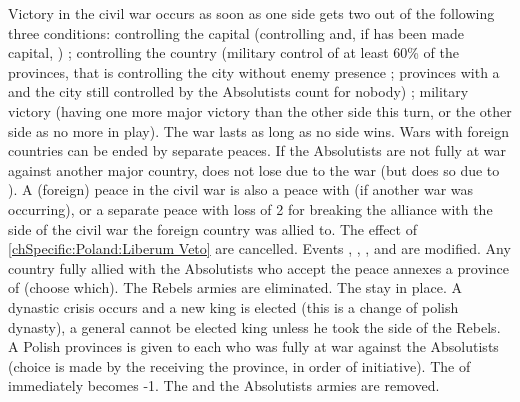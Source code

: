 \phpaix
\aparag Victory in the civil war occurs as soon as one side gets two out of
the following three conditions:
\bparag controlling the capital (controlling \provinceMalopolska and, if
\villeVarsovie has been made capital, \provinceMazowia) ;
\bparag controlling the country (military control of at least 60\% of the
provinces, that is controlling the city without enemy presence ; provinces
with a \REVOLT and the city still controlled by the Absolutists count for
nobody) ;
\bparag military victory (having one more major victory than the other side
this turn, or the other side as no more \ARMY in play).
\aparag The war lasts as long as no side wins.
\aparag Wars with foreign countries can be ended by separate peaces.
\bparag If the Absolutists are not fully at war against another major country,
\POL does not lose \STAB due to the war (but does so due to \REVOLT ).
\bparag A (foreign) peace in the civil war is also a peace with \POL (if
another war was occurring), or a separate peace with loss of 2 \STAB for
breaking the alliance with the side of the civil war the foreign country was
allied to.
\bparag The effect of \ref{chSpecific:Poland:Liberum Veto} are cancelled.
\bparag Events , ,
,  and
 are modified.
\bparag Any country fully allied with the Absolutists who accept the peace
annexes a province of \POL (\POL choose which).
\bparag The Rebels armies are eliminated.
\bparag The \REVOLT stay in place.
\bparag A dynastic crisis occurs and a new king is elected (this is a change
of polish dynasty), a general cannot be elected king unless he took the side
of the Rebels.
\bparag A Polish provinces is given to each \MAJ who was fully at war against
the Absolutists (choice is made by the \MAJ receiving the province, in order
of initiative).
\bparag The \STAB of \POL immediately becomes -1.
\bparag The \REVOLT and the Absolutists armies are removed.

\stopevents


